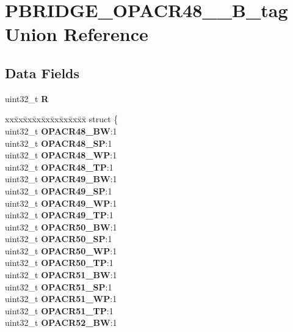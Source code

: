 \hypertarget{unionPBRIDGE__OPACR48__55__32B__tag}{}\section{P\+B\+R\+I\+D\+G\+E\+\_\+\+O\+P\+A\+C\+R48\+\_\+\_\+B\+\_\+tag Union Reference}
\label{unionPBRIDGE__OPACR48__55__32B__tag}
\subsection*{Data Fields}
\begin{DoxyCompactItemize}
\item 
\mbox{\label{unionPBRIDGE__OPACR48__55__32B__tag_a0ffcd23a2b9efd102a4abc4ee897c2dd}} 
uint32\+\_\+t {\bfseries R}
\item 
\mbox{\label{unionPBRIDGE__OPACR48__55__32B__tag_aee7824e49e6647945e8e0532208728eb}} 
\begin{tabbing}
xx\=xx\=xx\=xx\=xx\=xx\=xx\=xx\=xx\=\kill
struct \{\\
\>uint32\_t {\bfseries OPACR48\_BW}:1\\
\>uint32\_t {\bfseries OPACR48\_SP}:1\\
\>uint32\_t {\bfseries OPACR48\_WP}:1\\
\>uint32\_t {\bfseries OPACR48\_TP}:1\\
\>uint32\_t {\bfseries OPACR49\_BW}:1\\
\>uint32\_t {\bfseries OPACR49\_SP}:1\\
\>uint32\_t {\bfseries OPACR49\_WP}:1\\
\>uint32\_t {\bfseries OPACR49\_TP}:1\\
\>uint32\_t {\bfseries OPACR50\_BW}:1\\
\>uint32\_t {\bfseries OPACR50\_SP}:1\\
\>uint32\_t {\bfseries OPACR50\_WP}:1\\
\>uint32\_t {\bfseries OPACR50\_TP}:1\\
\>uint32\_t {\bfseries OPACR51\_BW}:1\\
\>uint32\_t {\bfseries OPACR51\_SP}:1\\
\>uint32\_t {\bfseries OPACR51\_WP}:1\\
\>uint32\_t {\bfseries OPACR51\_TP}:1\\
\>uint32\_t {\bfseries OPACR52\_BW}:1\\

\end{tabbing}
\end{DoxyCompactItemize}
